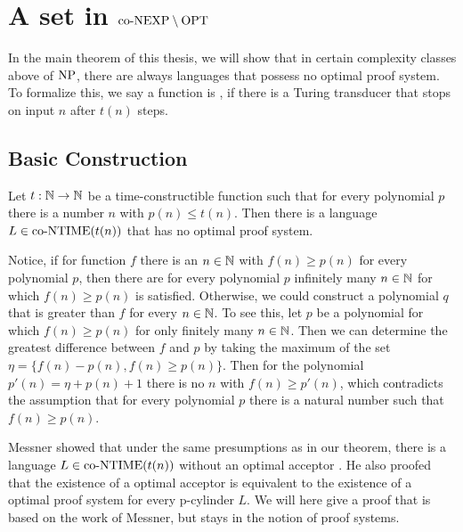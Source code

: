 \chapter{A set in $\text{co-NEXP} \setminus \text{OPT}$} \label{chpConexpMinusOpt}
  In the main theorem of this thesis, we will show that in certain complexity classes above of \(\text{NP}\), there are always languages that possess no optimal proof system. To formalize this, we say a function is , if there is a Turing transducer that stops on input \(n\) after \(t(n)\) steps.

  \section{Basic Construction}
  
  \begin{theorem}\label{thmMain}
    Let \(t : \mathbb{N} \to \mathbb{N}\) be a time-constructible function such that for every polynomial \(p\) there is a number \(n\) with \(p(n) \leq t(n)\). Then there is a language \(L \in \text{co-NTIME}(t(n))\) that has no optimal proof system.
  \end{theorem}

  Notice, if for function \(f\) there is an \(n \in \mathbb{N}\) with \(f(n) \geq p(n)\) for every polynomial \(p\), then there are for every polynomial \(p\) infinitely many \(n \in \mathbb{N}\) for which \(f(n) \geq p(n)\) is satisfied. Otherwise, we could construct a polynomial \(q\) that is greater than \(f\) for every \(n \in \mathbb{N}\). To see this, let \(p\) be a polynomial for which \(f(n) \geq p(n)\) for only finitely many \(n \in \mathbb{N}\). Then we can determine the greatest difference between \(f\) and \(p\) by taking the maximum of the set \(\eta = \{ f(n) - p(n), f(n) \geq p(n) \}\). Then for the polynomial \(p'(n) = \eta + p(n) + 1\) there is no \(n\) with \(f(n) \geq p'(n)\), which contradicts the assumption that for every polynomial \(p\) there is a natural number such that \(f(n) \geq p(n)\).

  Messner showed that under the same presumptions as in our theorem, there is a language \(L \in \text{co-NTIME}(t(n))\) without an optimal acceptor \cite{Mes99}. He also proofed that the existence of a optimal acceptor is equivalent to the existence of a optimal proof system for every p-cylinder \(L\). We will here give a proof that is based on the work of Messner, but stays in the notion of proof systems.

